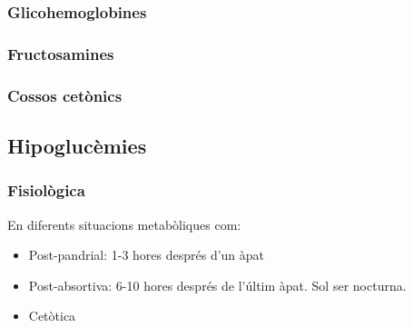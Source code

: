 \subsubsection{Glicohemoglobines}
\label{sec:glicohemoglobines}


\subsubsection{Fructosamines}
\label{sec:fructosamines}


\subsubsection{Cossos cetònics}
\label{sec:cossos-cetonics}


\subsection{Hipoglucèmies}
\label{sec:hipoglucemies}

\subsubsection{Fisiològica}
\label{sec:fisiologica}
En diferents situacions metabòliques com:
\begin{itemize}
\item Post-pandrial: 1-3 hores després d'un àpat
\item Post-absortiva: 6-10 hores després de l'últim àpat. Sol ser
  nocturna.
\item Cetòtica
\end{itemize}


